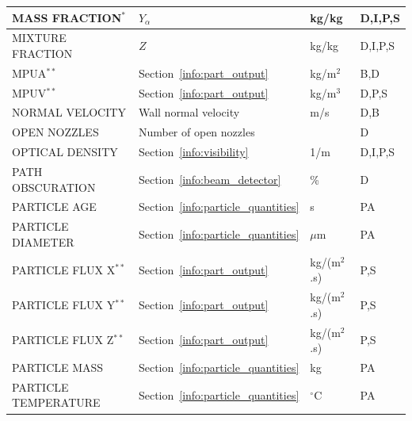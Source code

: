 \documentclass[11pt]{book}
\begin{document}
\begin{longtable}{@{\extracolsep{\fill}}|l|l|l|l|}
{\ct MASS FRACTION}$^*$                         & $Y_\alpha$                                    & kg/kg          & D,I,P,S      \\ \hline
{\ct MIXTURE FRACTION}                          & $Z$                                           & kg/kg          & D,I,P,S      \\ \hline
{\ct MPUA}$^{**}$                               & Section~\ref{info:part_output}                & kg/m$^2$       & B,D          \\ \hline
{\ct MPUV}$^{**}$                               & Section~\ref{info:part_output}                & kg/m$^3$       & D,P,S        \\ \hline
{\ct NORMAL VELOCITY}                           & Wall normal velocity                          & m/s            & D,B          \\ \hline
{\ct OPEN NOZZLES}                              & Number of open nozzles                        &                & D            \\ \hline
{\ct OPTICAL DENSITY}                           & Section~\ref{info:visibility}                 & 1/m            & D,I,P,S      \\ \hline
{\ct PATH OBSCURATION}                          & Section~\ref{info:beam_detector}              & \%             & D            \\ \hline
{\ct PARTICLE AGE}                              & Section~\ref{info:particle_quantities}        & s              & PA           \\ \hline
{\ct PARTICLE DIAMETER}                         & Section~\ref{info:particle_quantities}        & $\mu$m         & PA           \\ \hline
{\ct PARTICLE FLUX X}$^{**}$                    & Section~\ref{info:part_output}                & \si{kg/(m$^2$.s)} & P,S          \\ \hline
{\ct PARTICLE FLUX Y}$^{**}$                    & Section~\ref{info:part_output}                & \si{kg/(m$^2$.s)} & P,S          \\ \hline
{\ct PARTICLE FLUX Z}$^{**}$                    & Section~\ref{info:part_output}                & \si{kg/(m$^2$.s)} & P,S          \\ \hline
{\ct PARTICLE MASS}                             & Section~\ref{info:particle_quantities}        & kg             & PA           \\ \hline
{\ct PARTICLE TEMPERATURE}                      & Section~\ref{info:particle_quantities}        & $^\circ$C      & PA           \\ \hline

\end{longtable}
\end{document}
